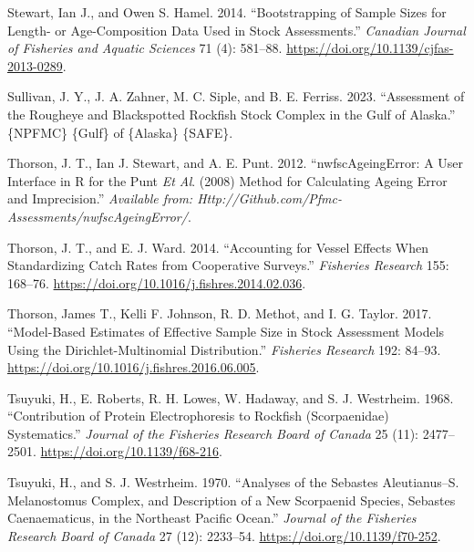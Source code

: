 \documentclass[
]{scrartcl}
\newlength{\cslhangindent}
\newenvironment{CSLReferences}[2] %
 {\begin{list}{}{%
  \setlength{\itemindent}{0pt}
  \setlength{\leftmargin}{0pt}
  \setlength{\parsep}{0pt}
  \ifodd #1
   \setlength{\leftmargin}{\cslhangindent}
   \setlength{\itemindent}{-1\cslhangindent}
  \fi
  \setlength{\itemsep}{#2\baselineskip}}}
 {\end{list}}
\begin{document}
\begin{CSLReferences}{1}{0}
Stewart, Ian J., and Owen S. Hamel. 2014. {``Bootstrapping of Sample
Sizes for Length- or Age-Composition Data Used in Stock Assessments.''}
\emph{Canadian Journal of Fisheries and Aquatic Sciences} 71 (4):
581--88. \url{https://doi.org/10.1139/cjfas-2013-0289}.

Sullivan, J. Y., J. A. Zahner, M. C. Siple, and B. E. Ferriss. 2023.
{``Assessment of the {Rougheye} and {Blackspotted} {Rockfish} Stock
Complex in the {Gulf} of {Alaska}.''} \{NPFMC\} \{Gulf\} of \{Alaska\}
\{SAFE\}.

Thorson, J. T., Ian J. Stewart, and A. E. Punt. 2012.
{``{nwfscAgeingError}: A User Interface in {R} for the {P}unt \emph{Et
Al}. (2008) Method for Calculating Ageing Error and Imprecision.''}
\emph{Available from:
Http://Github.com/Pfmc-Assessments/nwfscAgeingError/}.

Thorson, J. T., and E. J. Ward. 2014. {``Accounting for Vessel Effects
When Standardizing Catch Rates from Cooperative Surveys.''}
\emph{Fisheries Research} 155: 168--76.
\url{https://doi.org/10.1016/j.fishres.2014.02.036}.

Thorson, James T., Kelli F. Johnson, R. D. Methot, and I. G. Taylor.
2017. {``Model-Based Estimates of Effective Sample Size in Stock
Assessment Models Using the {Dirichlet}-Multinomial Distribution.''}
\emph{Fisheries Research} 192: 84--93.
\url{https://doi.org/10.1016/j.fishres.2016.06.005}.

Tsuyuki, H., E. Roberts, R. H. Lowes, W. Hadaway, and S. J. Westrheim.
1968. {``Contribution of {Protein} {Electrophoresis} to {Rockfish}
({Scorpaenidae}) {Systematics}.''} \emph{Journal of the Fisheries
Research Board of Canada} 25 (11): 2477--2501.
\url{https://doi.org/10.1139/f68-216}.

Tsuyuki, H., and S. J. Westrheim. 1970. {``Analyses of the {Sebastes}
Aleutianus--{S}. Melanostomus {Complex}, and {Description} of a New
{Scorpaenid} {Species}, {Sebastes} Caenaematicus, in the {Northeast}
{Pacific} {Ocean}.''} \emph{Journal of the Fisheries Research Board of
Canada} 27 (12): 2233--54. \url{https://doi.org/10.1139/f70-252}.

\end{CSLReferences}
\end{document}
